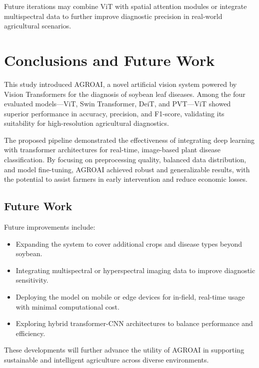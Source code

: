 \documentclass[preprint,12pt]{elsarticle}
\begin{document}
Future iterations may combine ViT with spatial attention modules or integrate multispectral data to further improve diagnostic precision in real-world agricultural scenarios.

\section{Conclusions and Future Work}

This study introduced AGROAI, a novel artificial vision system powered by Vision Transformers for the diagnosis of soybean leaf diseases. Among the four evaluated models—ViT, Swin Transformer, DeiT, and PVT—ViT showed superior performance in accuracy, precision, and F1-score, validating its suitability for high-resolution agricultural diagnostics.

The proposed pipeline demonstrated the effectiveness of integrating deep learning with transformer architectures for real-time, image-based plant disease classification. By focusing on preprocessing quality, balanced data distribution, and model fine-tuning, AGROAI achieved robust and generalizable results, with the potential to assist farmers in early intervention and reduce economic losses.

\subsection{Future Work}

Future improvements include:

\begin{itemize}
  \item Expanding the system to cover additional crops and disease types beyond soybean.
  \item Integrating multispectral or hyperspectral imaging data to improve diagnostic sensitivity.
  \item Deploying the model on mobile or edge devices for in-field, real-time usage with minimal computational cost.
  \item Exploring hybrid transformer-CNN architectures to balance performance and efficiency.
\end{itemize}

These developments will further advance the utility of AGROAI in supporting sustainable and intelligent agriculture across diverse environments.
\end{document}
